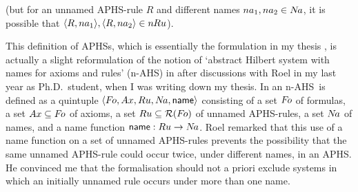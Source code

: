 \documentclass[envcountsame,runningheads]{llncs}
\newcommand{\pairlft}{{\langle}}
\newcommand{\pairrgt}{{\rangle}}
\newcommand{\pairsep}{{,\,}\nix}
\newcommand{\pairstr}[1]{\pairlft#1\pairrgt}
\newcommand{\pair}[2]{\pairstr{#1\pairsep#2}}
\newcommand{\triple}[2]{\pair{#1\pairsep#2}}
\newcommand{\quadruple}[2]{\triple{#1\pairsep#2}}
\newcommand{\quintuple}[2]{\quadruple{#1\pairsep#2}}
\newcommand{\sfunin}{{:}}
\newcommand{\funin}{\mathrel{\sfunin}}
\newcommand{\nix}{}
\newcommand{\funap}[2]{#1(#2)}
\newcommand{\APHS}{A\hspace*{-0.3pt}P\hspace*{-0.6pt}H\hspace*{-0.4pt}S}
\newcommand{\nAHS}{\mbox{n-AHS}}
\newcommand{\forms}{{\mit F\hspace*{-1.1pt}o}}
\newcommand{\axioms}{{\mit Ax}}
\newcommand{\rules}{{\mit Ru}}
\newcommand{\names}{\mit{N\hspace*{-1.2pt}a}}
\newcommand{\namedAxioms}{{\mit n\hspace*{-0.4pt}Ax}}
\newcommand{\namedRules}{{\mit n\hspace*{-0.4pt}Ru}}
\newcommand{\sname}{{\sf name}}
\newcommand{\name}{\funap{\sname}}
\newcommand{\aname}{{\mit na}}
\newcommand{\aunnamedRule}{R}
\newcommand{\sAPHSrules}{\mcl{R}}
\newcommand{\APHSrules}{\funap{\sAPHSrules}}
\newcommand{\mcl}{\mathcal}
\begin{document}
\begin{definition}
\begin{itemize}
\begin{enumerate}
          (but for an unnamed APHS-rule $\aunnamedRule$ and different
           names $\aname_1, \aname_2 \in\names$, it is possible that    
           $\pair{\aunnamedRule}{\aname_1}, \pair{\aunnamedRule}{\aname_2}\in\namedRules$).
\end{enumerate}
\begin{comment}
\begin{equation*}
(\forall \pair{A}{\name} \in\namedAxioms) \,
            (\forall \bsR\in\namedRules) \,
               \bigl[\, \name \neq \namef{\bsR} \,\bigr] \; ,
\end{equation*}
i.e.\ names of named axioms are different from names 
      of named rules, and
\begin{equation*}
(\forall \bsR_1,\bsR_2\in\namedRules) \,
         \bigl[\, 
               \bsR_1 \neq \bsR_2 
              \;\Longrightarrow\;
               \namef{\bsR_1} \neq \namef{\bsR_2}
            \,\bigr] \; .
\end{equation*}
i.e.\ different rules are differently named in $\namedRules$ 
      (but it is not excluded that the 
      same rule may occur with different names in $\namedRules$).
\end{comment}
\end{itemize}    
\end{definition}


This definition of \APHS{s}, which is essentially the formulation in
my thesis \cite{grab:2005}, is actually a slight reformulation of the notion of
`abstract Hilbert system with names for axioms and rules' (\nAHS)
in \cite{grab:2003} after discussions with Roel in my last year
as Ph.D.~student, when I was writing down my thesis.
In \cite{grab:2003} an \nAHS\ is defined as 
a quintuple $\quintuple{\forms}{\axioms}{\rules}{\names}{\sname}$
consisting of a set $\forms$ of formulas, a set $\axioms\subseteq\forms$
of axioms, a set $\rules\subseteq\APHSrules{\forms}$ of unnamed \APHS-rules,
a set $\names$ of names, and a name function
$\sname \funin \rules \to \names$.
Roel remarked that this use of a name function on a set of unnamed \APHS-rules 
prevents the possibility that the same unnamed \APHS-rule could occur twice,
under different names, in an \APHS. He convinced me that the formalisation should
not a priori exclude systems in which an initially unnamed rule occurs
under more than one name. 
\end{document}
